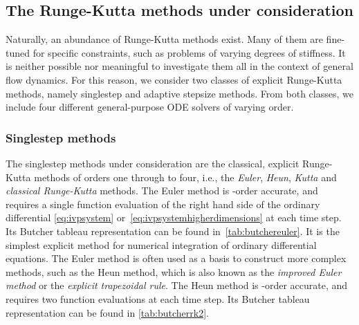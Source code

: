 \subsection{The Runge-Kutta methods under consideration}
\label{sub:the_runge_kutta_methods_under_consideration}

Naturally, an abundance of Runge-Kutta methods exist. Many of them are
fine-tuned for specific constraints, such as problems of varying degrees of
stiffness. It is neither possible nor meaningful to investigate them all
in the context of general flow dynamics. For this reason, we consider two classes
of explicit Runge-Kutta methods, namely singlestep and adaptive stepsize
methods. From both classes, we include four different general-purpose ODE solvers
of varying order.

\subsubsection{Singlestep methods}
\label{ssub:singlestep_methods}

The singlestep methods under consideration are the classical, explicit
Runge-Kutta methods of orders one through to four, i.e., the \emph{Euler},
\emph{Heun}, \emph{Kutta} and \emph{classical Runge-Kutta} methods. The
Euler method is -order accurate, and requires a single function
evaluation of the right hand side of the ordinary differential
\cref{eq:ivpsystem} or~\eqref{eq:ivpsystemhigherdimensions} at each time step.
Its Butcher tableau representation can be found in~\cref{tab:butchereuler}.
It is the simplest explicit method for numerical integration of ordinary
differential equations. The Euler method is often used as a basis to construct
more complex methods, such as the Heun method, which is also known as the
\emph{improved Euler method} or the \emph{explicit trapezoidal rule}. The Heun
method is -order accurate, and requires two function evaluations at each
time step. Its Butcher tableau representation can be found in
\cref{tab:butcherrk2}.


\clearpage


